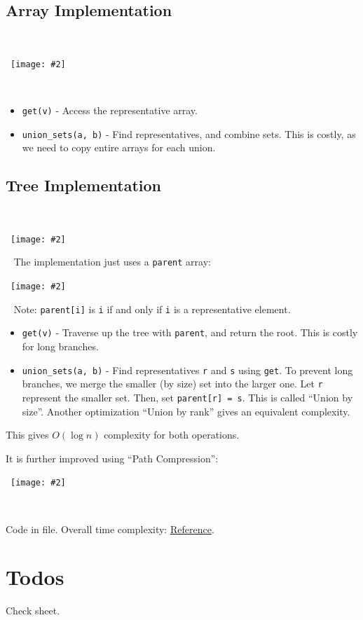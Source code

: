 \documentclass{article}
\newcommand{\T}[1]{\texttt{#1}}
\newcommand{\image}[2]{\
    \begin{center}\
        \texttt{[image: \#2]}\
    \end{center}\
}
\begin{document}
\begin{sloppypar}
    \subsection{Array Implementation}
    \image{0.9}{../images/dsu-2.png}
    \begin{itemize}
        \item \T{get(v)} - Access the representative array.
        \item \T{union\_sets(a, b)} - Find representatives, and combine sets. This is costly, as we need to copy entire arrays for each union.
    \end{itemize}

    \subsection{Tree Implementation}
    \image{0.5}{../images/dsu-3.png}
    The implementation just uses a \T{parent} array:
    \image{0.9}{../images/dsu-4.png}
    Note: \T{parent[i]} is \T{i} if and only if \T{i} is a representative element.
    \begin{itemize}
        \item \T{get(v)} - Traverse up the tree with \T{parent}, and return the root. This is costly for long branches.
        \item \T{union\_sets(a, b)} - Find representatives \T{r} and \T{s} using \T{get}. To prevent long branches, we merge the smaller (by size) set into the larger one. Let \T{r} represent the smaller set. Then, set \T{parent[r] = s}. This is called ``Union by size''. Another optimization ``Union by rank'' gives an equivalent complexity.
    \end{itemize}

    This gives $O(\log n)$ complexity for both operations.\\
    \noindent \par It is further improved using ``Path Compression'':
    \image{0.8}{../images/dsu-5.png}
    
    Code in file. Overall time complexity: \href{https://cp-algorithms.com/data_structures/disjoint_set_union.html#time-complexity}{Reference}.

    \section{Todos}
    Check sheet.

\end{sloppypar}
\end{document}

